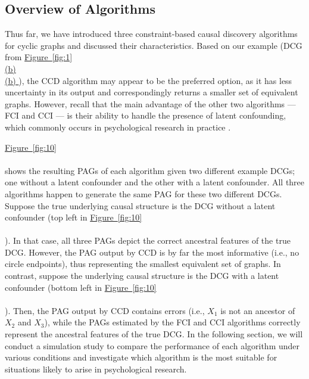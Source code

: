 \documentclass[twoside, 11pt]{article}
\newcommand*{\figref}[2][]{%
  \hyperref[{fig:#2}]{%
    Figure~\ref*{fig:#2}%
    \ifx\\#1\\%
    \else
      #1%
    \fi
  }%
}
\begin{document}

\subsection{Overview of Algorithms} \label{overview_algo}
Thus far, we have introduced three constraint-based causal discovery algorithms for cyclic graphs and discussed their characteristics. Based on our example (DCG from \figref[(b)]{1}), the CCD algorithm may appear to be the preferred option, as it has less uncertainty in its output and correspondingly returns a smaller set of equivalent graphs. However, recall that the main advantage of the other two algorithms --- FCI and CCI --- is their ability to handle the presence of latent confounding, which commonly occurs in psychological research in practice \citep{rohrer_thinking_2018}. 

\figref[]{10} shows the resulting PAGs of each algorithm given two different example DCGs; one without a latent confounder and the other with a latent confounder. All three algorithms happen to generate the same PAG for these two different DCGs. Suppose the true underlying causal structure is the DCG without a latent confounder (top left in \figref[]{10}). In that case, all three PAGs depict the correct ancestral features of the true DCG. However, the PAG output by CCD is by far the most informative (i.e., no circle endpoints), thus representing the smallest equivalent set of graphs. In contrast, suppose the underlying causal structure is the DCG with a latent confounder (bottom left in \figref[]{10}). Then, the PAG output by CCD contains errors (i.e., $X_1$ is not an ancestor of $X_2$ and $X_3$), while the PAGs estimated by the FCI and CCI algorithms correctly represent the ancestral features of the true DCG. In the following section, we will conduct a simulation study to compare the performance of each algorithm under various conditions and investigate which algorithm is the most suitable for situations likely to arise in psychological research.


\end{document}
